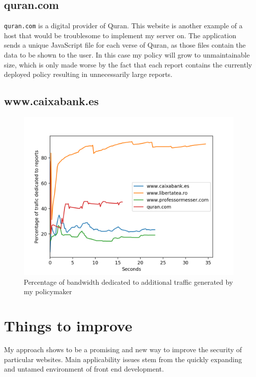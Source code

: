 \subsection{quran.com}

\texttt{quran.com} is a digital provider of Quran. 
This website is another example of a host that would be troublesome to implement my server on.
The application sends a unique JavaScript file for each verse of Quran, as those files contain the data to be shown to the user.
In this case my policy will grow to unmaintainable size, which is only made worse by the fact that each report contains the currently deployed policy resulting in unnecessarily large reports.

\subsection{www.caixabank.es}


\begin{figure}[h]
	\centering
	\includegraphics[width=\textwidth]{imgs/netword_usage_plot.png}
	\caption{Percentage of bandwidth dedicated to additional traffic generated by my policymaker}
\end{figure}


\section{Things to improve}

My approach shows to be a promising and new way to improve the security of particular websites.
Main applicability issues stem from the quickly expanding and untamed environment of front end development.

